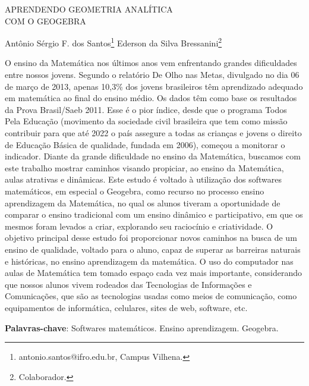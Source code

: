 \documentclass[article,12pt,onesidea,4paper,english,brazil]{abntex2}
\begin{document}
	
	
	\frenchspacing 
	
	\begin{center}
		\LARGE APRENDENDO GEOMETRIA ANALÍTICA\\COM O GEOGEBRA
		
		\normalsize
    	Antônio Sérgio F. dos Santos\footnote{antonio.santos@ifro.edu.br, Campus Vilhena.} 
		Ederson da Silva Bressanini\footnote{Colaborador.} 
	\end{center}
	
	\noindent O ensino da Matemática nos últimos anos vem enfrentando grandes dificuldades entre nossos jovens. Segundo o relatório De Olho nas Metas, divulgado no dia 06 de março de 2013, apenas 10,3\% dos jovens brasileiros têm aprendizado adequado em matemática ao final do ensino médio. Os dados têm como base os resultados da Prova Brasil/Saeb 2011. Esse é o pior índice, desde que o programa Todos Pela Educação (movimento da sociedade civil brasileira que tem como missão contribuir para que até 2022 o país assegure a todas as crianças e jovens o direito de Educação Básica de qualidade, fundada em 2006), começou a monitorar o indicador. Diante da grande dificuldade no ensino da Matemática, buscamos com este trabalho mostrar caminhos visando propiciar, ao ensino da Matemática, aulas atrativas e dinâmicas. Este estudo é voltado à utilização dos softwares matemáticos, em especial o Geogebra, como recurso no processo ensino aprendizagem da Matemática, no qual os alunos tiveram a oportunidade de comparar o ensino tradicional com um ensino dinâmico e participativo, em que os mesmos foram levados a criar, explorando seu raciocínio e criatividade. O objetivo principal desse estudo foi proporcionar novos caminhos na busca de um ensino de qualidade, voltado para o aluno, capaz de superar as barreiras naturais e históricas, no ensino aprendizagem da matemática. O uso do computador nas aulas de Matemática tem tomado espaço cada vez mais importante, considerando que nossos alunos vivem rodeados das Tecnologias de Informações e Comunicações, que são as tecnologias usadas como meios de comunicação, como equipamentos de informática, celulares, sites de web, software, etc.
	
	\vspace{\onelineskip}
	
	\noindent
	\textbf{Palavras-chave}: Softwares matemáticos. Ensino aprendizagem. Geogebra.
	
\end{document}
